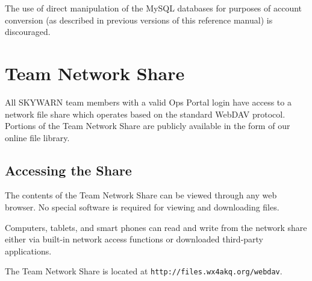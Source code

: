 \documentclass[pdflatex,letterpaper,twoside,12pt]{book}
\begin{document}
The use of direct manipulation of the MySQL databases for purposes of account conversion (as described in previous versions of this reference manual) is discouraged.


\chapter{Team Network Share}\label{team-network-share}

All SKYWARN team members with a valid Ops Portal login have access to a network file share which operates based on the standard WebDAV protocol.  Portions of the Team Network Share are publicly available in the form of our online file library.


\section{Accessing the Share}

The contents of the Team Network Share can be viewed through any web browser.  No special software is required for viewing and downloading files.

Computers, tablets, and smart phones can read and write from the network share either via built-in network access functions or downloaded third-party applications.

The Team Network Share is located at \texttt{http://files.wx4akq.org/webdav}.

\end{document}
